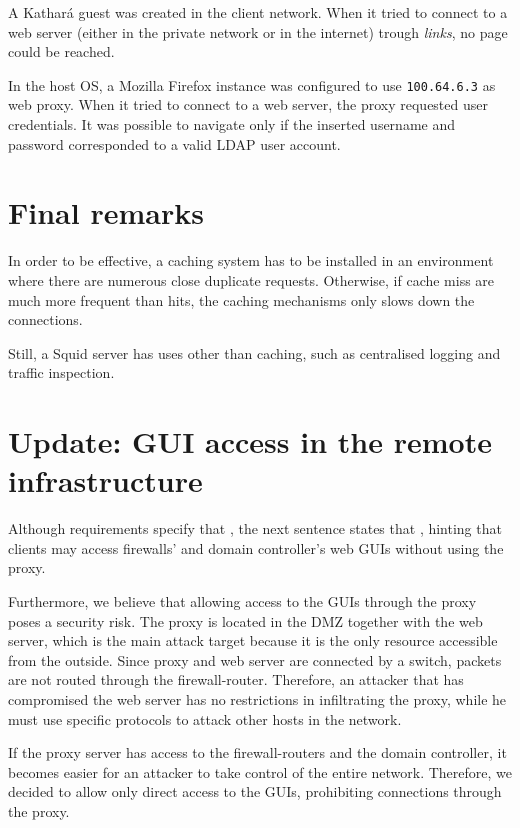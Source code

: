 \documentclass{homework}
\newcommand{\kat}{Kathará\xspace}
\newcommand{\sq}{Squid\xspace}
\begin{document}
    A \kat guest was created in the client network.
    When it tried to connect to a web server (either in the private network or in the internet) trough \textit{links}, no page could be reached.
    
    In the host OS, a Mozilla Firefox instance was configured to use \texttt{100.64.6.3} as web proxy.
    When it tried to connect to a web server, the proxy requested user credentials.
    It was possible to navigate only if the inserted username and password corresponded to a valid LDAP user account.
    
    
    \section{Final remarks}
    In order to be effective, a caching system has to be installed in an environment where there are numerous close duplicate requests.
    Otherwise, if cache miss are much more frequent than hits, the caching mechanisms only slows down the connections.
    
    Still, a \sq server has uses other than caching, such as centralised logging and traffic inspection.
    
    \section{Update: GUI access in the remote infrastructure}
    Although requirements specify that , the next sentence states that , hinting that clients may access firewalls' and domain controller's web GUIs without using the proxy.
    
    Furthermore, we believe that allowing access to the GUIs through the proxy poses a security risk. The proxy is located in the DMZ together with the web server, which is the main attack target because it is the only resource accessible from the outside.
    Since proxy and web server are connected by a switch, packets are not routed through the firewall-router.
    Therefore, an attacker that has compromised the web server has no restrictions in infiltrating the proxy, while he must use specific protocols to attack other hosts in the network.
    
    If the proxy server has access to the firewall-routers and the domain controller, it becomes easier for an attacker to take control of the entire network.
    Therefore, we decided to allow only direct access to the GUIs, prohibiting connections through the proxy.
\end{document}
